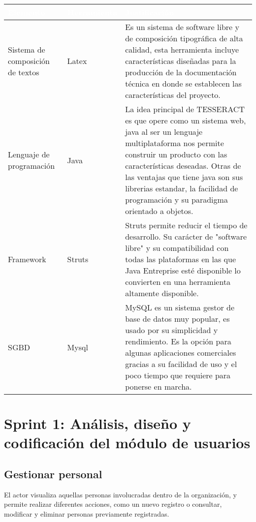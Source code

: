 \begin{table}[H]
	\centering
	\begin{tabular}{|p{3cm}|p{3cm}|p{6cm}|}
		\hline
		\rowcolor{black} \textcolor{white} {\textbf{Elemento}} & \textcolor{white}{\textbf{Herramienta}} & \textcolor{white}{\textbf{Justificación}}  \\ \hline
		Sistema de composición de textos & Latex & Es un sistema de software libre y de composición tipográfica de alta calidad, esta herramienta incluye características diseñadas para la producción de la documentación técnica en donde se establecen las características del proyecto. \\
		\hline
		Lenguaje de programación & Java & La idea principal de TESSERACT es que opere como un sistema web, java al ser un lenguaje multiplataforma nos permite construir un producto con las características deseadas. Otras de las ventajas que tiene java son sus librerias estandar, la facilidad de programación y su paradigma orientado a objetos. \\
		\hline
		Framework & Struts & Struts permite reducir el tiempo de desarrollo. Su carácter de "software libre" y su compatibilidad con todas las plataformas en las que Java Entreprise esté disponible lo convierten en una herramienta altamente disponible. \\
		\hline
		SGBD & Mysql & MySQL es un sistema gestor de base de datos muy popular, es usado por su simplicidad y rendimiento. Es la opción para algunas aplicaciones comerciales gracias a su facilidad de uso y el poco tiempo que requiere para ponerse en marcha.  \\
		\hline
	\end{tabular}
\end{table}

\section{Sprint 1: Análisis, diseño y codificación del módulo de usuarios}

\subsection{Gestionar personal}

El actor visualiza aquellas personas involucradas dentro de la organización, y permite realizar diferentes acciones, como un nuevo registro o consultar, modificar y eliminar personas previamente registradas.


